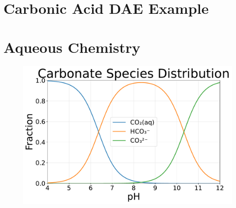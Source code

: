 \documentclass{beamer}
\begin{document}
\begin{frame}

\end{frame}

\begin{frame}

\end{frame}

\begin{frame}

\end{frame}

\section{Carbonic Acid DAE Example}

\section{Aqueous Chemistry}

\begin{frame}

\end{frame}

\begin{frame}

\end{frame}

\begin{frame}

\end{frame}

\begin{frame}
\begin{figure}
\includegraphics[scale=0.4]{../plots/carbonate_speciation.pdf}
\end{figure}
\end{frame}
\end{document}
